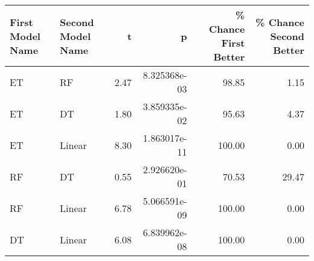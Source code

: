 \begin{tabular}{llrrrr}
\toprule
First Model Name & Second Model Name &    t &            p &  \% Chance First Better &  \% Chance Second Better \\
\midrule
              ET &                RF & 2.47 & 8.325368e-03 &                  98.85 &                    1.15 \\
              ET &                DT & 1.80 & 3.859335e-02 &                  95.63 &                    4.37 \\
              ET &            Linear & 8.30 & 1.863017e-11 &                 100.00 &                    0.00 \\
              RF &                DT & 0.55 & 2.926620e-01 &                  70.53 &                   29.47 \\
              RF &            Linear & 6.78 & 5.066591e-09 &                 100.00 &                    0.00 \\
              DT &            Linear & 6.08 & 6.839962e-08 &                 100.00 &                    0.00 \\
\bottomrule
\end{tabular}
